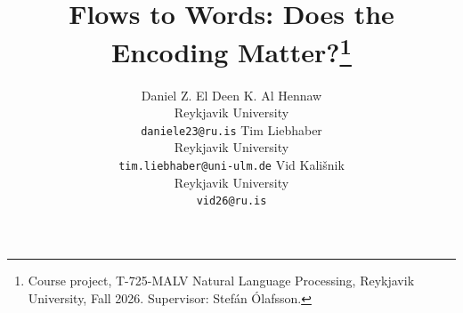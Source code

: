 \documentclass[11pt]{article}
\title{Flows to Words: Does the Encoding Matter?\thanks{Course project, T-725-MALV Natural Language Processing,
  Reykjavik University, Fall 2026. Supervisor: Stefán Ólafsson.}}
\author{Daniel Z. El Deen K. Al Hennaw \\ Reykjavik University \\ \texttt{daniele23@ru.is} \And
  Tim Liebhaber \\ Reykjavik University \\ \texttt{tim.liebhaber@uni-ulm.de} \And
  Vid Kali\v{s}nik \\ Reykjavik University \\ \texttt{vid26@ru.is}}
\begin{document}
\maketitle


















\onecolumn
\appendix




\end{document}
